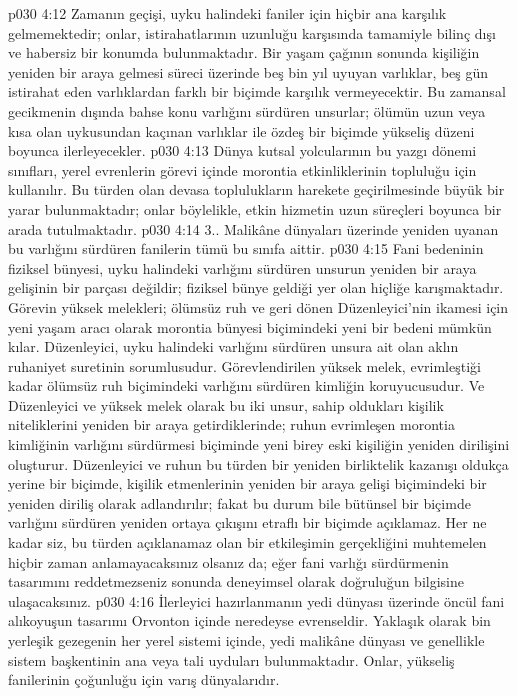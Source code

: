 \vs p030 4:12 Zamanın geçişi, uyku halindeki faniler için hiçbir ana karşılık gelmemektedir; onlar, istirahatlarının uzunluğu karşısında tamamiyle bilinç dışı ve habersiz bir konumda bulunmaktadır. Bir yaşam çağının sonunda kişiliğin yeniden bir araya gelmesi süreci üzerinde beş bin yıl uyuyan varlıklar, beş gün istirahat eden varlıklardan farklı bir biçimde karşılık vermeyecektir. Bu zamansal gecikmenin dışında bahse konu varlığını sürdüren unsurlar; ölümün uzun veya kısa olan uykusundan kaçınan varlıklar ile özdeş bir biçimde yükseliş düzeni boyunca ilerleyecekler.
\vs p030 4:13 Dünya kutsal yolcularının bu yazgı dönemi sınıfları, yerel evrenlerin görevi içinde morontia etkinliklerinin topluluğu için kullanılır. Bu türden olan devasa toplulukların harekete geçirilmesinde büyük bir yarar bulunmaktadır; onlar böylelikle, etkin hizmetin uzun süreçleri boyunca bir arada tutulmaktadır.
\vs p030 4:14 3.\bibnobreakspace {}. Malikâne dünyaları üzerinde yeniden uyanan bu varlığını sürdüren fanilerin tümü bu sınıfa aittir.
\vs p030 4:15 Fani bedeninin fiziksel bünyesi, uyku halindeki varlığını sürdüren unsurun yeniden bir araya gelişinin bir parçası değildir; fiziksel bünye geldiği yer olan hiçliğe karışmaktadır. Görevin yüksek melekleri; ölümsüz ruh ve geri dönen Düzenleyici’nin ikamesi için yeni yaşam aracı olarak morontia bünyesi biçimindeki yeni bir bedeni mümkün kılar. Düzenleyici, uyku halindeki varlığını sürdüren unsura ait olan aklın ruhaniyet suretinin sorumlusudur. Görevlendirilen yüksek melek, evrimleştiği kadar ölümsüz ruh biçimindeki varlığını sürdüren kimliğin koruyucusudur. Ve Düzenleyici ve yüksek melek olarak bu iki unsur, sahip oldukları kişilik niteliklerini yeniden bir araya getirdiklerinde; ruhun evrimleşen morontia kimliğinin varlığını sürdürmesi biçiminde yeni birey eski kişiliğin yeniden dirilişini oluşturur. Düzenleyici ve ruhun bu türden bir yeniden birliktelik kazanışı oldukça yerine bir biçimde, kişilik etmenlerinin yeniden bir araya gelişi biçimindeki bir yeniden diriliş olarak adlandırılır; fakat bu durum bile bütünsel bir biçimde varlığını sürdüren  yeniden ortaya çıkışını etraflı bir biçimde açıklamaz. Her ne kadar siz, bu türden açıklanamaz olan bir etkileşimin gerçekliğini muhtemelen hiçbir zaman anlamayacaksınız olsanız da; eğer fani varlığı sürdürmenin tasarımını reddetmezseniz sonunda deneyimsel olarak doğruluğun bilgisine ulaşacaksınız.
\vs p030 4:16 İlerleyici hazırlanmanın yedi dünyası üzerinde öncül fani alıkoyuşun tasarımı Orvonton içinde neredeyse evrenseldir. Yaklaşık olarak bin yerleşik gezegenin her yerel sistemi içinde, yedi malikâne dünyası ve genellikle sistem başkentinin ana veya tali uyduları bulunmaktadır. Onlar, yükseliş fanilerinin çoğunluğu için varış dünyalarıdır.
